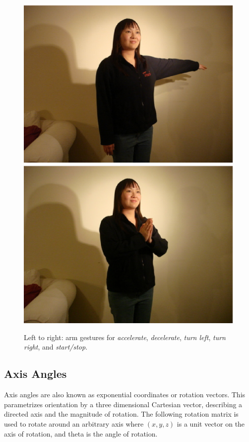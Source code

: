\documentclass[12pt,a4,notitlepage]{report}
\renewcommand{\_}{\texttt{\symbol{95}}}
\newcommand{\<}{\texttt{\symbol{60}}}
\renewcommand{\>}{\texttt{\symbol{62}}}
\begin{document}
\begin{figure}
\includegraphics[scale=0.3,angle=0]{images/right.ps}
\includegraphics[scale=0.3,angle=0]{images/startstop.ps}
\caption{Left to right: arm gestures for \textit{accelerate}, \textit{decelerate}, \textit{turn left}, \textit{turn right}, and \textit{start/stop}.}
\label{gestures}
\end{figure}

\subsection{Axis Angles}

Axis angles are also known as exponential coordinates or rotation vectors. This parametrizes orientation by a three dimensional Cartesian vector, describing a directed axis and the magnitude of rotation. The following rotation matrix\cite{GraphicsGems} is used to rotate around an arbitrary axis where $(x,y,z)$ is a unit vector on the axis of rotation, and theta is the angle of rotation.
\end{document}
